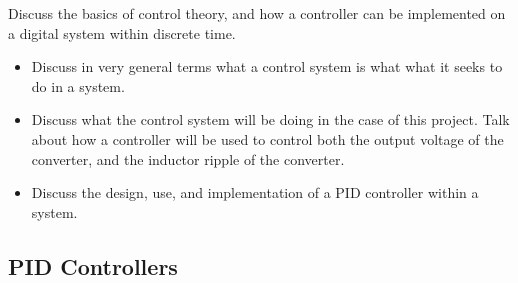 Discuss the basics of control theory, and how a controller can be implemented on a digital system within discrete time. 

\begin{itemize}

    \item
        Discuss in very general terms what a control system is what what it seeks to do in a system.

    \item
        Discuss what the control system will be doing in the case of this project. Talk about how a controller will be used to control both the output voltage of the converter, and the inductor ripple of the converter.

    \item 
        Discuss the design, use, and implementation of a PID controller within a system. 

\end{itemize}

\subsection{PID Controllers}\label{S:PID_back}